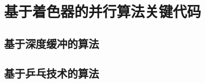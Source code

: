 \chapter{基于着色器的并行算法关键代码}
\label{appendix:shader-chapter}

\section{基于深度缓冲的算法}
\label{app-sec:shader-z-buffer}

%





\section{基于乒乓技术的算法}
\label{app-sec:shader-rtt-pingpong}


